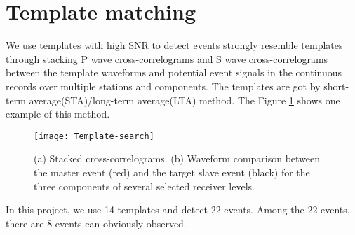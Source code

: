 \section{Template matching}
We use templates with high SNR to detect events strongly resemble templates through stacking P wave cross-correlograms and S wave cross-correlograms between the template waveforms and potential event signals in the continuous records over multiple stations and components. The templates are got by short-term average(STA)/long-term average(LTA) method. The Figure \ref{fig:method} shows one example of this method.
\begin{figure}[htbp] 
\centering 
\texttt{[image: Template-search]} 
\caption{\label{fig:method} (a) Stacked cross-correlograms. (b) Waveform comparison between the master event (red) and the target slave event (black) for the three components of several selected receiver levels.} 
\end{figure}
In this project, we use 14 templates and detect 22 events. Among the 22 events, there are 8 events can obviously observed.

